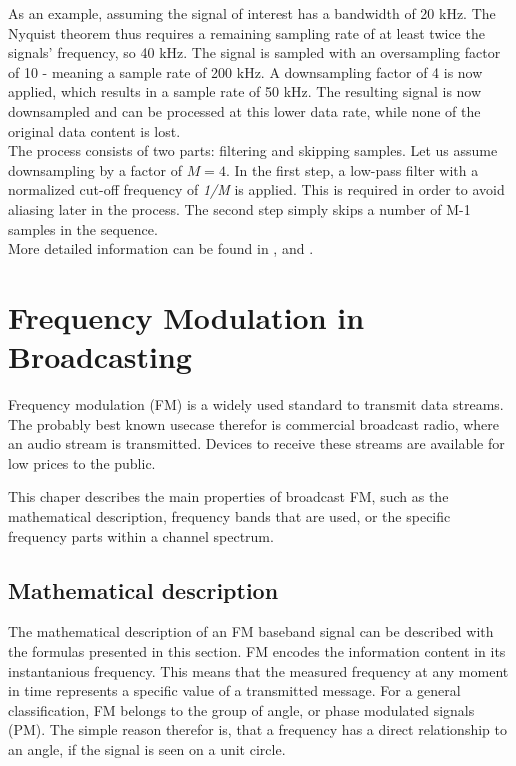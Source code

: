 As an example, assuming the signal of interest has a bandwidth of 20 kHz.
The Nyquist theorem thus requires a remaining sampling rate of at least twice the signals' frequency, so 40 kHz.
The signal is sampled with an oversampling factor of 10 - meaning a sample rate of 200 kHz.
A downsampling factor of 4 is now applied, which results in a sample rate of 50 kHz.
The resulting signal is now downsampled and can be processed at this lower data rate, while none of the original data content is lost.\\

The process consists of two parts: filtering and skipping samples.
Let us assume downsampling by a factor of $M=4$.
In the first step, a low-pass filter with a normalized cut-off frequency of \textit{1/M} is applied.
This is required in order to avoid aliasing later in the process.
The second step simply skips a number of M-1 samples in the sequence.\\

More detailed information can be found in \cite[chpt. 6.9]{AlessioSilviaMaria2016DSPa}, \cite[chpt. 4.1]{GopiE.S2018MDSP} and \cite[chpt. 10.2.2]{ThyagarajanK.S2019ItDS}.

\section{Frequency Modulation in Broadcasting}

Frequency modulation (FM) is a widely used standard to transmit data streams.
The probably best known usecase therefor is commercial broadcast radio, where an audio stream is transmitted.
Devices to receive these streams are available for low prices to the public.

This chaper describes the main properties of broadcast FM, such as the mathematical description, frequency bands that are used, or the specific frequency parts within a channel spectrum.

\subsection{Mathematical description}

The mathematical description of an FM baseband signal can be described with the formulas presented in this section.
FM encodes the information content in its instantanious frequency.
This means that the measured frequency at any moment in time represents a specific value of a transmitted message.
For a general classification, FM belongs to the group of angle, or phase modulated signals (PM).
The simple reason therefor is, that a frequency has a direct relationship to an angle, if the signal is seen on a unit circle.\\

